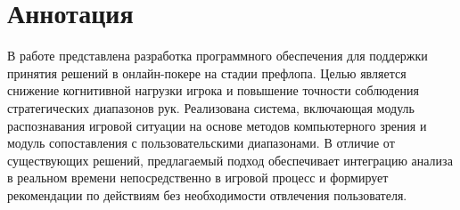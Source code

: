 \section*{Аннотация}

В работе представлена разработка программного обеспечения для поддержки принятия решений в онлайн-покере на стадии префлопа. Целью является снижение когнитивной нагрузки игрока и повышение точности соблюдения стратегических диапазонов рук. Реализована система, включающая модуль распознавания игровой ситуации на основе методов компьютерного зрения и модуль сопоставления с пользовательскими диапазонами. В отличие от существующих решений, предлагаемый подход обеспечивает интеграцию анализа в реальном времени непосредственно в игровой процесс и формирует рекомендации по действиям без необходимости отвлечения пользователя.
